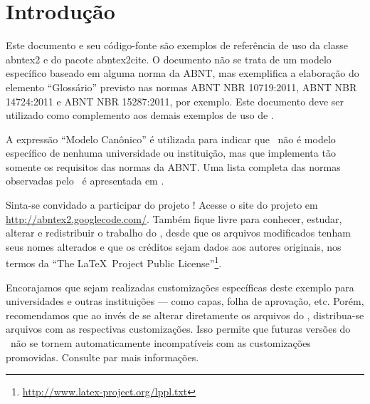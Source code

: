 \documentclass[12pt,openright,twoside,a4paper,brazil]{abntex2}
\begin{document}
 
\frenchspacing
 
 
\imprimircapa
 
\tableofcontents*
\cleardoublepage
  
 
\textual
 
\chapter*[Introdução]{Introdução}
 
Este documento e seu código-fonte são exemplos de referência de uso da classe
\textsf{abntex2} e do pacote \textsf{abntex2cite}. O documento não se trata de
um modelo específico baseado em alguma norma da ABNT, mas exemplifica a
elaboração do elemento ``Glossário'' previsto nas normas ABNT NBR
10719:2011, ABNT NBR 14724:2011 e ABNT NBR 15287:2011, por exemplo. Este
documento deve ser utilizado como complemento aos demais exemplos de uso de
\abnTeX.

A expressão ``Modelo Canônico'' é utilizada para indicar que \abnTeX\ não é
modelo específico de nenhuma universidade ou instituição, mas que implementa tão
somente os requisitos das normas da ABNT. Uma lista completa das normas
observadas pelo \abnTeX\ é apresentada em .
 
Sinta-se convidado a participar do projeto \abnTeX! Acesse o site do projeto em
\url{http://abntex2.googlecode.com/}. Também fique livre para conhecer,
estudar, alterar e redistribuir o trabalho do \abnTeX, desde que os arquivos
modificados tenham seus nomes alterados e que os créditos sejam dados aos
autores originais, nos termos da ``The \LaTeX\ Project Public
License''\footnote{\url{http://www.latex-project.org/lppl.txt}}.
 
Encorajamos que sejam realizadas customizações específicas deste exemplo para
universidades e outras instituições --- como capas, folha de aprovação, etc.
Porém, recomendamos que ao invés de se alterar diretamente os arquivos do
\abnTeX, distribua-se arquivos com as respectivas customizações.
Isso permite que futuras versões do \abnTeX~não se tornem automaticamente
incompatíveis com as customizações promovidas. Consulte
 par mais informações.
 
\end{document}
